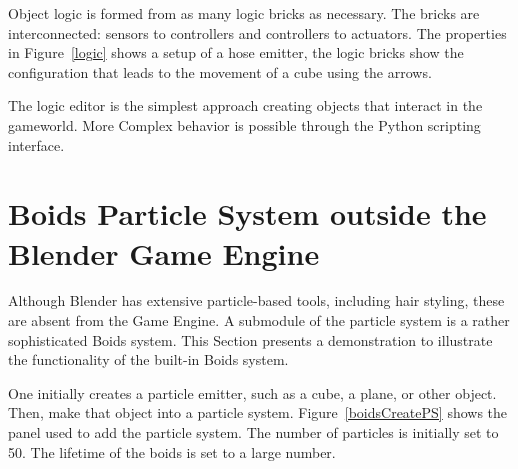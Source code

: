 Object logic is formed from as many logic bricks as necessary. The bricks are interconnected: sensors to controllers and controllers to actuators. The properties in Figure~\ref{logic} shows a setup of a hose emitter, the logic bricks show the configuration that leads to the movement of a cube using the arrows.

The logic editor is the simplest approach creating objects that interact in the gameworld. More Complex behavior is possible through the Python scripting interface.

\section{Boids Particle System outside the Blender Game Engine}
Although Blender has extensive particle-based tools, including hair styling, these are absent from the Game Engine. A submodule of the particle system is a rather sophisticated Boids system. This Section presents a demonstration to illustrate the functionality of the built-in Boids system. 

One initially creates a particle emitter, such as a cube, a plane, or other object. Then, make that object into a particle system. Figure~\ref{boidsCreatePS} shows the panel used to add the particle system. The number of particles is initially set to 50. The lifetime of the boids is set to a large number.

